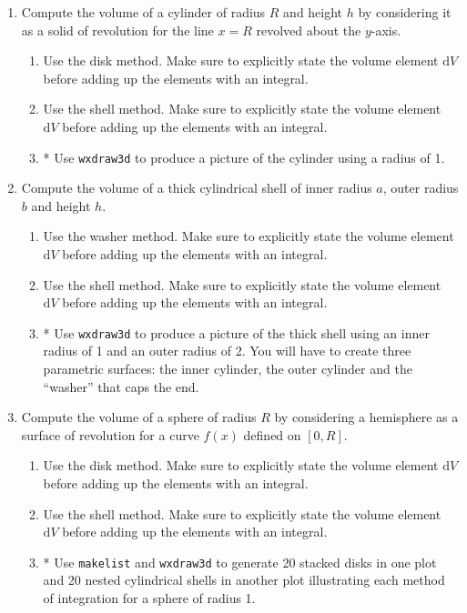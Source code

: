 \documentclass[10.5pt,twoside]{report}
\theoremstyle{definition}
\begin{document}
\begin{enumerate}
\item Compute the volume of a cylinder of radius $R$ and height $h$ by considering it as a solid of revolution for the line $x=R$ revolved about the $y$-axis.
\begin{enumerate}
  \item Use the disk method.  Make sure to explicitly state the volume element $\mathrm{d}V$ before adding up the elements with an integral.
  \item Use the shell method.  Make sure to explicitly state the volume element $\mathrm{d}V$ before adding up the elements with an integral.
  \item * Use \verb|wxdraw3d| to produce a picture of the cylinder using a radius of 1.
\end{enumerate}
  
\item Compute the volume of a thick cylindrical shell of inner radius $a$, outer radius $b$ and height $h$.
\begin{enumerate}
  \item Use the washer method.  Make sure to explicitly state the volume element $\mathrm{d}V$ before adding up the elements with an integral.
  \item Use the shell method.  Make sure to explicitly state the volume element $\mathrm{d}V$ before adding up the elements with an integral.
  \item * Use \verb|wxdraw3d| to produce a picture of the thick shell using an inner radius of 1 and an outer radius of 2.  You will have to create three parametric surfaces:  the inner cylinder, the outer cylinder and the ``washer'' that caps the end.
\end{enumerate}

\item Compute the volume of a sphere of radius $R$ by considering a hemisphere as a surface of revolution for a curve $f(x)$ defined on $[0,R]$.  \\
\begin{enumerate}
  \item Use the disk method.  Make sure to explicitly state the volume element $\mathrm{d}V$ before adding up the elements with an integral.
  \item Use the shell method.  Make sure to explicitly state the volume element $\mathrm{d}V$ before adding up the elements with an integral.
  \item * Use \verb|makelist| and \verb|wxdraw3d| to generate 20 stacked disks in one plot and 20 nested cylindrical shells in another plot illustrating each method of integration for a sphere of radius 1.
\end{enumerate}
      

\end{enumerate}
\end{document}
